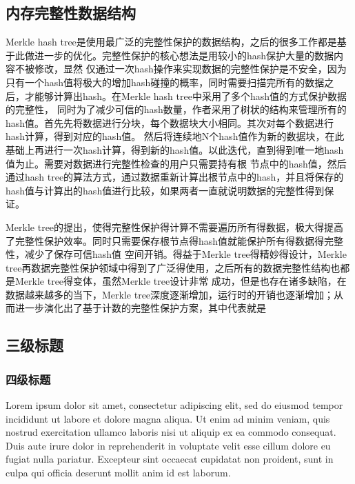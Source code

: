 \subsection{内存完整性数据结构}
Merkle hash tree是使用最广泛的完整性保护的数据结构，之后的很多工作都是基于此做进一步的优化。完整性保护的核心想法是用较小的hash保护大量的数据内容不被修改，显然
仅通过一次hash操作来实现数据的完整性保护是不安全，因为只有一个hash值将极大的增加hash碰撞的概率，同时需要扫描完所有的数据之后，才能够计算出hash。在Merkle hash tree中采用了多个hash值的方式保护数据的完整性，
同时为了减少可信的hash数量，作者采用了树状的结构来管理所有的hash值。首先先将数据进行分块，每个数据块大小相同。其次对每个数据进行hash计算，得到对应的hash值。
然后将连续地N个hash值作为新的数据块，在此基础上再进行一次hash计算，得到新的hash值。以此迭代，直到得到唯一地hash值为止。需要对数据进行完整性检查的用户只需要持有根
节点中的hash值，然后通过hash tree的算法方式，通过数据重新计算出根节点中的hash，并且将保存的hash值与计算出的hash值进行比较，如果两者一直就说明数据的完整性得到保证。

Merkle tree的提出，使得完整性保护得计算不需要遍历所有得数据，极大得提高了完整性保护效率。同时只需要保存根节点得hash值就能保护所有得数据得完整性，减少了保存可信hash值
空间开销。得益于Merkle tree得精妙得设计，Merkle tree再数据完整性保护领域中得到了广泛得使用，之后所有的数据完整性结构也都是Merkle tree得变体，虽然Merkle tree设计非常
成功，但是也存在诸多缺陷，在数据越来越多的当下，Merkle tree深度逐渐增加，运行时的开销也逐渐增加；从而进一步演化出了基于计数的完整性保护方案，其中代表就是


\subsection{三级标题}

\subsubsection{四级标题}

Lorem ipsum dolor sit amet, consectetur adipiscing elit, sed do eiusmod tempor
incididunt ut labore et dolore magna aliqua. Ut enim ad minim veniam, quis
nostrud exercitation ullamco laboris nisi ut aliquip ex ea commodo consequat.
Duis aute irure dolor in reprehenderit in voluptate velit esse cillum dolore eu
fugiat nulla pariatur. Excepteur sint occaecat cupidatat non proident, sunt in
culpa qui officia deserunt mollit anim id est laborum.
